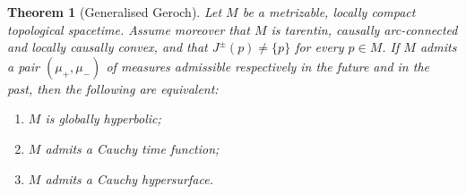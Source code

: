 \documentclass[a4paper,twoside]{article}
\newtheorem{theo}{Theorem}
\begin{document}
\begin{theo}[Generalised Geroch]\label{theo:geroch}
Let $M$ be a metrizable, locally compact topological spacetime.
Assume moreover that $M$ is tarentin, causally arc-connected and locally causally convex, and that
$J^\pm(p)\neq \{p\}$ for every $p\in M$.
If $M$ admits a pair $(\mu_+,\mu_-)$ of measures admissible respectively in the future and in the
past, then the following are equivalent:
\begin{enumerate}[label=(\roman*)]
\item $M$ is globally hyperbolic;
\item $M$ admits a Cauchy time function;
\item $M$ admits a Cauchy hypersurface.
\end{enumerate}
\end{theo}
\end{document}
